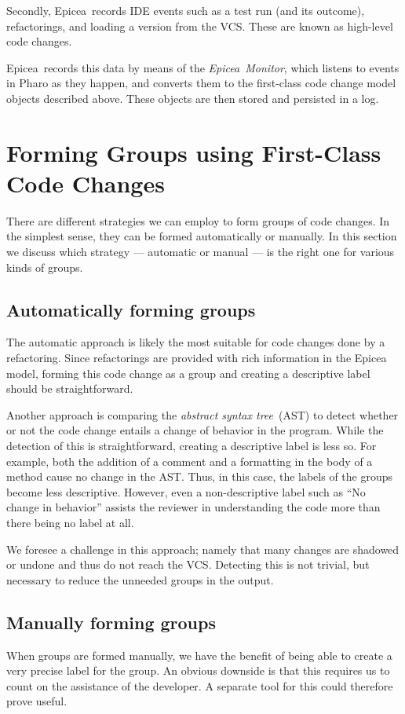 \documentclass[conference,a4paper]{IEEEtran}
\newcommand{\Ep}{Epicea}
\begin{document}
Secondly, \Ep\ records IDE events such as a test run (and its
outcome), refactorings, and loading a version from the VCS. These are
known as high-level code changes.

\Ep\ records this data by means of the \textit{\Ep\ Monitor}, which
listens to events in Pharo as they happen, and converts them to the
first-class code change model objects described above. These objects
are then stored and persisted in a log.

\section{Forming Groups using First-Class Code Changes}
\label{sec:code-review-using}
There are different strategies we can employ to form groups of code
changes. In the simplest sense, they can be formed automatically or
manually. In this section we discuss which strategy --- automatic or
manual --- is the right one for various kinds of groups.

\subsection{Automatically forming groups}
\label{sec:autom-form-groups}
The automatic approach is likely the most suitable for code changes
done by a refactoring. Since refactorings are provided with rich
information in the Epicea model, forming this code change as a group
and creating a descriptive label should be straightforward.

Another approach is comparing the \textit{abstract syntax tree}\ (AST)
to detect whether or not the code change entails a change of behavior
in the program. While the detection of this is straightforward,
creating a descriptive label is less so. For example, both the
addition of a comment and a formatting in the body of a method cause
no change in the AST. Thus, in this case, the labels of the groups
become less descriptive. However, even a non-descriptive label such as
``No change in behavior'' assists the reviewer in understanding the
code more than there being no label at all.

We foresee a challenge in this approach; namely that many changes are
shadowed or undone and thus do not reach the
VCS\cite{Nega12a}. Detecting this is not trivial, but necessary to
reduce the unneeded groups in the output.

\subsection{Manually forming groups}
\label{sec:manu-form-groups}
When groups are formed manually, we have the benefit of being able to
create a very precise label for the group. An obvious downside is that
this requires us to count on the assistance of the developer. A
separate tool for this could therefore prove useful.
\end{document}
